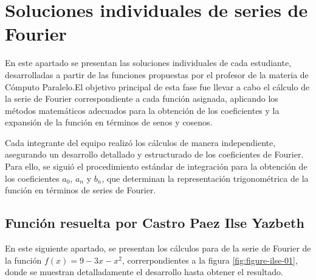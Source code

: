 \chapter[Soluciones individuales de series de Fourier]{Soluciones individuales de series de Fourier}
\label{cp:user-guide}

{
\parindent0pt

En este apartado se presentan las soluciones individuales de cada estudiante, desarrolladas a partir de las funciones propuestas por el profesor de la materia de Cómputo Paralelo.El objetivo principal de esta fase fue llevar a cabo el cálculo de la serie de Fourier correspondiente a cada función asignada, aplicando los métodos matemáticos adecuados para la obtención de los coeficientes y la expansión de la función en términos de senos y cosenos.
\vspace{10pt}

Cada integrante del equipo realizó los cálculos de manera independiente, asegurando un desarrollo detallado y estructurado de los coeficientes de Fourier. Para ello, se siguió el procedimiento estándar de integración para la obtención de los coeficientes \(a_0\), \(a_n\) y \(b_n\), que determinan la representación trigonométrica de la función en términos de series de Fourier.
\newpage

\section{Función resuelta por Castro Paez Ilse Yazbeth}
En este siguiente apartado, se presentan los cálculos para de la serie de Fourier de la función \(f(x)=9-3x-x^2\), correrpondientes a la figura \ref{fig:figure-ilse-01}, donde se muestran detalladamente el desarrollo hasta obtener el resultado. 

}
